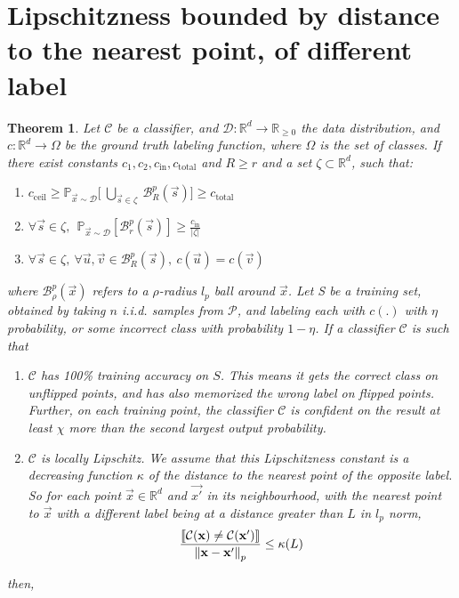 \documentclass{ociamthesis}
\newtheorem{theorem}{Theorem}
\begin{document}
\section{Lipschitzness bounded by distance to the nearest point, of different label}
\begin{theorem}
    \label{theorem:Lipschitzness-extension-closest-one}
    Let $\mathcal{C}$ be a classifier, and $\mathcal{D}: \mathbb{R}^d \to
    \mathbb{R}_{\geq 0}$ the data distribution, and $c: \mathbb{R}^d \to \Omega$
    be the ground truth labeling function, where $\Omega$ is the set of classes.
    If there exist constants $c_1, c_2, c_{\text{in}}, c_{\text{total}}$ and $R
    \geq r$ and a set $\zeta \subset \mathbb{R}^d$, such that:
    \begin{enumerate}
        \item $c_{\text{ceil}} \geq \mathbb{P}_{\vec{x} \sim \mathcal{D}} \bigg
        [~\underset{\vec{s} \in \zeta}{\bigcup}~\mathcal{B}_R^p(\vec{s}) \bigg ]
        \geq c_{\text{total}}$
        \item $\forall \vec{s} \in \zeta,~~ \mathbb{P}_{\vec{x} \sim
        \mathcal{D}} [\mathcal{B}_r^p(\vec{s})] \geq
        \frac{c_{\text{in}}}{|\zeta|}$
        \item $\forall \vec{s} \in \zeta,~\forall \vec{u}, \vec{v} \in
        \mathcal{B}_R^p(\vec{s}),~c(\vec{u}) = c(\vec{v})$
    \end{enumerate}
    where $\mathcal{B}^p_\rho(\vec{x})$ refers to a $\rho$-radius $l_p$ ball
    around $\vec{x}$. Let S be a training set, obtained by taking $n$ i.i.d.
    samples from $\mathcal{P}$, and labeling each with $c(.)$ with $\eta$
    probability, or some incorrect class with probability $1-\eta$. If a
    classifier $\mathcal{C}$ is such that
    \begin{enumerate}
        \item $\mathcal{C}$ has 100\% training accuracy on $S$. This means it
        gets the correct class on unflipped points, and has also memorized the
        wrong label on flipped points. Further, on each training point, the
        classifier $\mathcal{C}$ is confident on the result at least $\chi$ more
        than the second largest output probability.
        \item $\mathcal{C}$ is locally Lipschitz. We assume that this
        Lipschitzness constant is a decreasing function $\kappa$ of the distance
        to the nearest point of the opposite label. So for each point $\vec{x}
        \in \mathbb{R}^d$ and $\vec{x'}$ in its neighbourhood, with the nearest
        point to $\vec{x}$ with a different label being at a distance greater
        than $L$ in $l_p$ norm,
            \begin{equation*}
                \frac{\llbracket \mathcal{C}({\mathbf{x}}) \neq \mathcal{C}({\mathbf{x'}}) \rrbracket}
                    {\mathrm{\left\lVert{\mathbf{x}} - {\mathbf{x'}}\right\rVert}_p} 
                \leq \kappa(L)
            \end{equation*}
    \end{enumerate}
    then,


\end{theorem}
\end{document}
